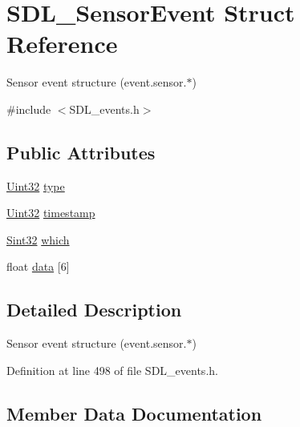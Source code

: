 \hypertarget{struct_s_d_l___sensor_event}{}\section{S\+D\+L\+\_\+\+Sensor\+Event Struct Reference}
\label{struct_s_d_l___sensor_event}


Sensor event structure (event.\+sensor.$\ast$)  




{\ttfamily \#include $<$S\+D\+L\+\_\+events.\+h$>$}

\subsection*{Public Attributes}
\begin{DoxyCompactItemize}
\item 
\mbox{\hyperlink{_s_d_l__stdinc_8h_add440eff171ea5f55cb00c4a9ab8672d}{Uint32}} \mbox{\hyperlink{struct_s_d_l___sensor_event_a0173d64fbe5299cad956298faf3fb0f9}{type}}
\item 
\mbox{\hyperlink{_s_d_l__stdinc_8h_add440eff171ea5f55cb00c4a9ab8672d}{Uint32}} \mbox{\hyperlink{struct_s_d_l___sensor_event_a7de6c2b4d4791f5553b5de225293ceb5}{timestamp}}
\item 
\mbox{\hyperlink{_s_d_l__stdinc_8h_a7a90b941db9d4582e9ad7abb9940ff7e}{Sint32}} \mbox{\hyperlink{struct_s_d_l___sensor_event_aa1c130192bad9b316f811f2d138b3b22}{which}}
\item 
float \mbox{\hyperlink{struct_s_d_l___sensor_event_ab08c166baa755f66b13df0d66ed6d29b}{data}} \mbox{[}6\mbox{]}
\end{DoxyCompactItemize}


\subsection{Detailed Description}
Sensor event structure (event.\+sensor.$\ast$) 

Definition at line 498 of file S\+D\+L\+\_\+events.\+h.



\subsection{Member Data Documentation}
\mbox{\label{struct_s_d_l___sensor_event_ab08c166baa755f66b13df0d66ed6d29b}} 
